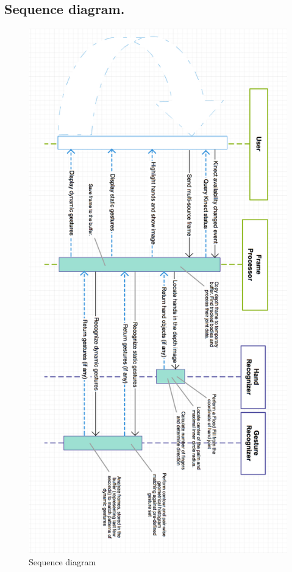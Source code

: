 \documentclass[a4paper,11pt,oneside]{article}
\begin{document}
\newpage
\subsection{Sequence diagram.}

\begin{figure}[H]
\centering
\includegraphics[scale=0.55]{sequence-dia.png}
\caption{Sequence diagram}
\end{figure}

\renewcommand{\refname}{\section{References}}



\end{document}
